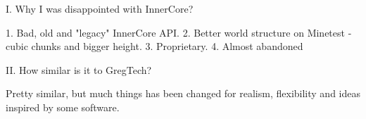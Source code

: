 I. Why I was disappointed with InnerCore?

1. Bad, old and "legacy" InnerCore API.
2. Better world structure on Minetest - cubic chunks and bigger height.
3. Proprietary.
4. Almost abandoned

II. How similar is it to GregTech?

Pretty similar, but much things has been changed for realism, flexibility and ideas inspired by some software.